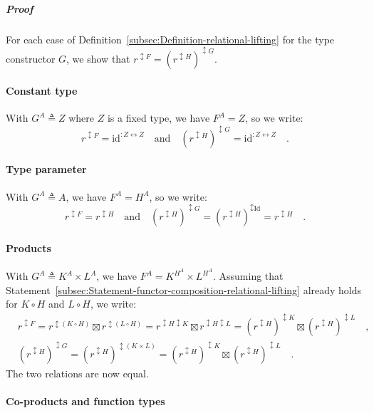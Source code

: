 \subparagraph{Proof}

For each case of Definition~\ref{subsec:Definition-relational-lifting}
for the type constructor $G$, we show that $r^{\updownarrow F}=(r^{\updownarrow H})^{\updownarrow G}$.

\paragraph{Constant type}

With $G^{A}\triangleq Z$ where $Z$ is a fixed type, we have $F^{A}=Z$,
so we write:
\[
r^{\updownarrow F}=\text{id}^{:Z\leftrightarrow Z}\quad\text{and}\quad(r^{\updownarrow H})^{\updownarrow G}=\text{id}^{:Z\leftrightarrow Z}\quad.
\]


\paragraph{Type parameter}

With $G^{A}\triangleq A$, we have $F^{A}=H^{A}$, so we write:
\[
r^{\updownarrow F}=r^{\updownarrow H}\quad\text{and}\quad(r^{\updownarrow H})^{\updownarrow G}=(r^{\updownarrow H})^{\updownarrow\text{Id}}=r^{\updownarrow H}\quad.
\]


\paragraph{Products}

With $G^{A}\triangleq K^{A}\times L^{A}$, we have $F^{A}=K^{H^{A}}\times L^{H^{A}}$.
Assuming that Statement~\ref{subsec:Statement-functor-composition-relational-lifting}
already holds for $K\circ H$ and $L\circ H$, we write:
\begin{align*}
 & r^{\updownarrow F}=r^{\updownarrow(K\circ H)}\boxtimes r^{\updownarrow(L\circ H)}=r^{\updownarrow H\updownarrow K}\boxtimes r^{\updownarrow H\updownarrow L}=(r^{\updownarrow H})^{\updownarrow K}\boxtimes(r^{\updownarrow H})^{\updownarrow L}\quad,\\
 & (r^{\updownarrow H})^{\updownarrow G}=(r^{\updownarrow H})^{\updownarrow(K\times L)}=(r^{\updownarrow H})^{\updownarrow K}\boxtimes(r^{\updownarrow H})^{\updownarrow L}\quad.
\end{align*}
The two relations are now equal.

\paragraph{Co-products and function types}

